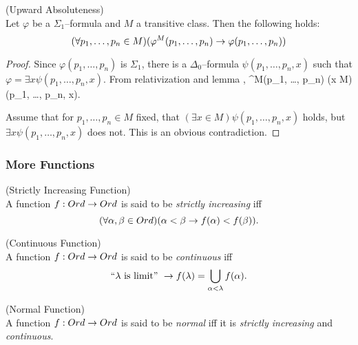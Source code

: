 \begin{lemma}{(Upward Absoluteness)}\label{lemma:upward_absoluteness}\\
Let $\varphi$ be a $\Sigma_1$–formula and $M$ a transitive class. Then the following holds:
\begin{equation}
(\forall p_1, \ldots, p_n \in M)(\varphi^M(p_1, \ldots, p_n) \rightarrow \varphi(p_1, \ldots, p_n))
\end{equation}
\end{lemma}
\begin{proof}
Since $\varphi(p_1, \ldots, p_n)$ is $\Sigma_1$, there is a $\Delta_0$–formula $\psi(p_1, \ldots, p_n, x)$ such that $\varphi = \exists x \psi(p_1, \ldots, p_n, x)$. 
From relativization and lemma ,
\beq
\varphi^M(p_1, \ldots, p_n) \iff (\exists x \in M)\psi(p_1, \ldots, p_n, x)\mbox{.}
\eeq

Assume that for $p_1, \ldots, p_n \in M$ fixed, that $(\exists x \in M)\psi(p_1, \ldots, p_n, x)$ holds, but $\exists x \psi(p_1, \ldots, p_n, x)$ does not. This is an obvious contradiction.
\end{proof}


\subsubsection{More Functions}

\begin{definition}{(Strictly Increasing Function)}\label{def:increasing_function}\\
A function $f: Ord \rightarrow Ord$ is said to be \emph{strictly increasing} iff
\begin{equation}
(\forall \alpha, \beta \in Ord) (\alpha < \beta \rightarrow f(\alpha) < f(\beta)).
\end{equation}
\end{definition}

\begin{definition}{(Continuous Function)}\label{def:continuous_function}\\
A function $f: Ord \rightarrow Ord$ is said to be \emph{continuous} iff
\begin{equation}
\mbox{``}\lambda\mbox{ is limit'' } \rightarrow f(\lambda) = \bigcup_{\alpha < \lambda} f(\alpha).
\end{equation}
\end{definition}

\begin{definition}{(Normal Function)}\label{def:normal_function}\\
A function $f: Ord \rightarrow Ord$ is said to be \emph{normal} iff it is \emph{strictly increasing} and \emph{continuous}.
\end{definition}

